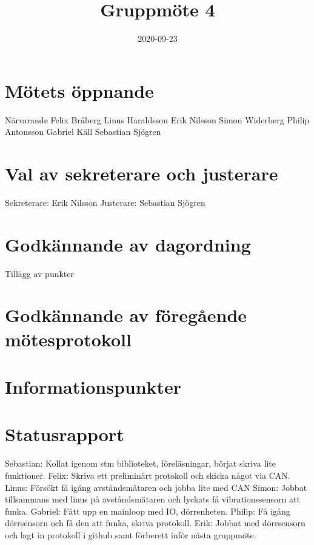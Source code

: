 \documentclass[a4paper]{article}
\begin{document}
\title{Gruppmöte 4}
\date{2020-09-23}
\maketitle

\section{Mötets öppnande}
\label{sec:roller}
Närvarande
Felix Bråberg
Linus Haraldsson
Erik Nilsson
Simon Widerberg
Philip Antonsson
Gabriel Käll
Sebastian Sjögren

\section{Val av sekreterare och justerare}
\label{sec:val}
Sekreterare: Erik Nilsson
\newline
Justerare: Sebastian Sjögren


\section{Godkännande av dagordning}
\label{sec:godk}
Tillägg av punkter






\section{Godkännande av föregående mötesprotokoll}
\label{sec:godk}

\section{Informationspunkter}
\label{sec:inf}

\section{Statusrapport}
\label{sec:stat}
Sebastian: Kollat igenom stm biblioteket, föreläsningar, börjat skriva lite funktioner.
\newline \newline
Felix: Skriva ett preliminärt protokoll och skicka något via CAN.
\newline \newline
Linus: Försökt få igång avståndsmätaren och jobba lite med CAN
\newline \newline
Simon: Jobbat tillsammans med linus på avståndsmätaren och lyckats få vibrationssensorn att funka.
\newline \newline
Gabriel: Fått upp en mainloop med IO, dörrenheten.
\newline \newline
Philip: Få igång dörrsensorn och få den att funka, skriva protokoll.
\newline \newline
Erik: Jobbat med dörrsensorn och lagt in protokoll i github samt förberett inför nästa gruppmöte.
\end{document}
